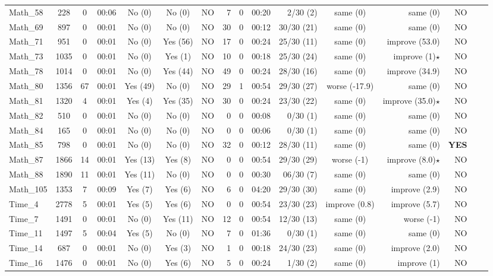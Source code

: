 \begin{table*}[htbp]
\begin{tabular}{|l|c|c|c|c|c|r|r|r|r|r|c|r|r|r|r|}
Math\_58 & 228 & 0 & 00:06 & No (0) & No (0) & NO & 7 & 0 & 00:20 & 2/30 (2) & same (0) & same (0) & NO\\
Math\_69 & 897 & 0 & 00:01 & No (0) & No (0) & NO & 30 & 0 & 00:12 & 30/30 (21) & same (0) & same (0) & NO\\
Math\_71 & 951 & 0 & 00:01 & No (0) & Yes (56) & NO & 17 & 0 & 00:24 & 25/30 (11) & same (0) & improve (53.0) & NO\\
Math\_73 & 1035 & 0 & 00:01 & No (0) & Yes (1) & NO & 10 & 0 & 00:18 & 25/30 (24) & same (0) & improve (1)$\star$ & NO\\
Math\_78 & 1014 & 0 & 00:01 & No (0) & Yes (44) & NO & 49 & 0 & 00:24 & 28/30 (16) & same (0) & improve (34.9) & NO\\
Math\_80 & 1356 & 67 & 00:01 & Yes (49) & No (0) & NO & 29 & 1 & 00:54 & 29/30 (27) & worse (-17.9) & same (0) & NO\\
Math\_81 & 1320 & 4 & 00:01 & Yes (4) & Yes (35) & NO & 30 & 0 & 00:24 & 23/30 (22) & same (0) & improve (35.0)$\star$ & NO\\
Math\_82 & 510 & 0 & 00:01 & No (0) & No (0) & NO & 0 & 0 & 00:08 & 0/30 (1) & same (0) & same (0) & NO\\
Math\_84 & 165 & 0 & 00:01 & No (0) & No (0) & NO & 0 & 0 & 00:06 & 0/30 (1) & same (0) & same (0) & NO\\
Math\_85 & 798 & 0 & 00:01 & No (0) & No (0) & NO & 32 & 0 & 00:12 & 28/30 (11) & same (0) & same (0) & \bf{YES}\\
Math\_87 & 1866 & 14 & 00:01 & Yes (13) & Yes (8) & NO & 0 & 0 & 00:54 & 29/30 (29) & worse (-1) & improve (8.0)$\star$ & NO\\
Math\_88 & 1890 & 11 & 00:01 & Yes (11) & No (0) & NO & 0 & 0 & 00:30 & 06/30 (7) & same (0) & same (0) & NO\\
Math\_105 & 1353 & 7 & 00:09 & Yes (7) & Yes (6) & NO & 6 & 0 & 04:20 & 29/30 (30) & same (0) & improve (2.9) & NO\\
Time\_4 & 2778 & 5 & 00:01 & Yes (5) & Yes (6) & NO & 0 & 0 & 00:54 & 23/30 (23) & improve (0.8) & improve (5.7) & NO\\
Time\_7 & 1491 & 0 & 00:01 & No (0) & Yes (11) & NO & 12 & 0 & 00:54 & 12/30 (13) & same (0) & worse (-1) & NO\\
Time\_11 & 1497 & 5 & 00:04 & Yes (5) & No (0) & NO & 7 & 0 & 01:36 & 0/30 (1) & same (0) & same (0) & NO\\
Time\_14 & 687 & 0 & 00:01 & No (0) & Yes (3) & NO & 1 & 0 & 00:18 & 24/30 (23) & same (0) & improve (2.0) & NO\\
Time\_16 & 1476 & 0 & 00:01 & No (0) & Yes (6) & NO & 5 & 0 & 00:24 & 1/30 (2) & same (0) & improve (1) & NO\\
    \hline
  \end{tabular}
\end{table*}